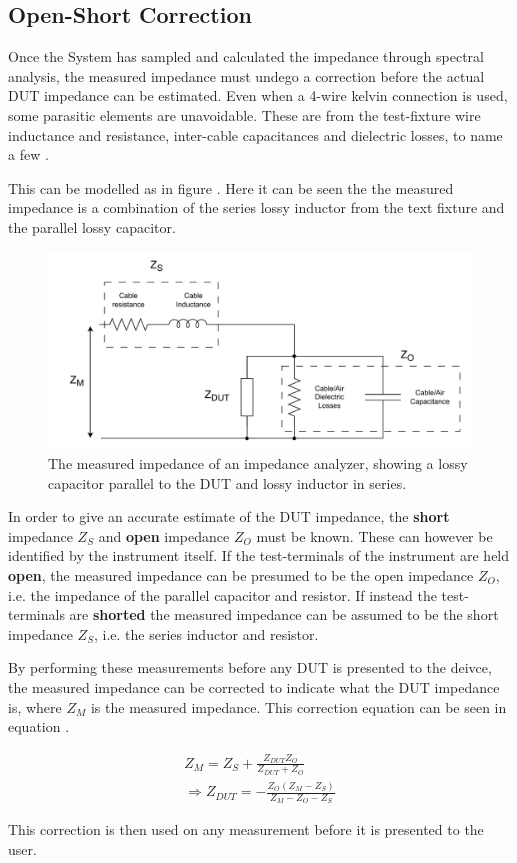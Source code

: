 \subsection{Open-Short Correction} \label{subsec:SpectralAnalysis} 
Once the System has sampled and calculated the impedance through spectral analysis, the measured impedance must undego a correction before the actual DUT impedance can be estimated. Even when a 4-wire kelvin connection is used, some parasitic elements are unavoidable. These are from the test-fixture wire inductance and resistance, inter-cable capacitances and dielectric losses, to name a few \cite{OpenShort}.

This can be modelled as in figure . Here it can be seen the the measured impedance is a combination of the series lossy inductor from the text fixture and the parallel lossy capacitor. 

\begin{figure}[H]
    \centering
    \includegraphics[clip, trim=0 0 0 0, width=1.0\textwidth]{Sections/7_SystemDesign/Figures/OpenShort.pdf}
    \caption{The measured impedance of an impedance analyzer, showing a lossy capacitor parallel to the DUT and lossy inductor in series.}
    \label{fig_7_3_3_5_OpenShort}
\end{figure}

In order to give an accurate estimate of the DUT impedance, the \textbf{short} impedance $Z_S$ and \textbf{open} impedance $Z_O$ must be known. These can however be identified by the instrument itself. If the test-terminals of the instrument are held \textbf{open}, the measured impedance can be presumed to be the open impedance $Z_O$, i.e. the impedance of the parallel capacitor and resistor. If instead the test-terminals are \textbf{shorted} the measured impedance can be assumed to be the short impedance $Z_S$, i.e. the series inductor and resistor.

By performing these measurements before any DUT is presented to the deivce, the measured impedance can be corrected to indicate what the DUT impedance is, where $Z_M$ is the measured impedance. This correction equation can be seen in equation .

\begin{equation}
\label{eq:OpenShort}
\begin{split}
    Z_M = Z_S + \frac{Z_{DUT}Z_O}{Z_{DUT}+Z_O} \\
    \Rightarrow Z_{DUT} = -\frac{Z_O(Z_M-Z_S)}{Z_M-Z_O-Z_S} 
\end{split}
\end{equation}

This correction is then used on any measurement before it is presented to the user. 